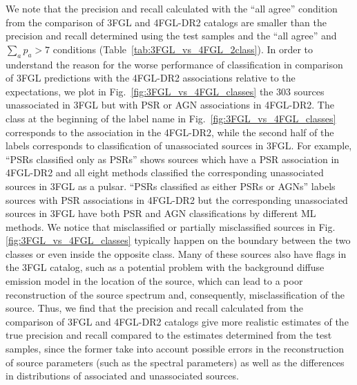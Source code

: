 \documentclass{aa}
\newcommand{\dima}[1]{\textcolor{blue}{(Dima: #1)}}
\begin{document}
We note that the precision and recall calculated with the ``all agree'' condition from the comparison of 3FGL and 4FGL-DR2 catalogs are smaller than the precision and recall determined using the test samples and the ``all agree'' and $\sum_a p_a > 7$ conditions (Table~\ref{tab:3FGL_vs_4FGL_2class}).
In order to understand the reason for the worse performance of classification in comparison of 3FGL predictions with the 4FGL-DR2 associations relative to the expectations, we plot in Fig.~\ref{fig:3FGL_vs_4FGL_classes} the 303 sources unassociated in 3FGL but with PSR or AGN associations in 4FGL-DR2.
The class at the beginning of the label name in Fig.~\ref{fig:3FGL_vs_4FGL_classes} corresponds to the association in the 4FGL-DR2, while the second half of the labels corresponds to classification of unassociated sources in 3FGL. For example, ``PSRs classified only as PSRs'' shows sources which have a PSR association in 4FGL-DR2 and all eight methods classified the corresponding unassociated sources in 3FGL as a pulsar. ``PSRs classified as either PSRs or AGNs'' labels sources with PSR associations in 4FGL-DR2 but the corresponding unassociated sources in 3FGL have both PSR and AGN classifications by different ML methods.
We notice that misclassified or partially misclassified sources in Fig. \ref{fig:3FGL_vs_4FGL_classes} typically happen on the boundary between the two classes or even inside the opposite class.
Many of these sources also have flags in the 3FGL catalog, such as a potential problem with the background diffuse emission model in the location of the source, which can lead to a poor reconstruction of the source spectrum and, consequently, misclassification of the source.
Thus, we find that the precision and recall calculated from the comparison of 3FGL and 4FGL-DR2 catalogs give more realistic estimates
of the true precision and recall compared to the estimates determined from the test samples, since the former
take into account possible errors in the reconstruction of source parameters (such as the spectral parameters) as well as the differences in distributions of associated and unassociated sources.

%
\end{document}

